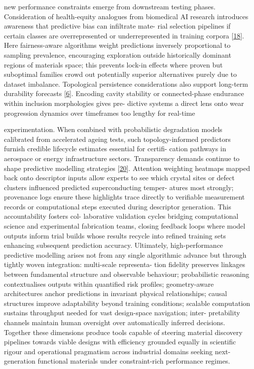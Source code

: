 \documentclass[
]{article}
\begin{document}
new performance constraints emerge from downstream testing phases.
Consideration of health-equity analogues from biomedical AI research
introduces awareness that predictive bias can infiltrate mate- rial
selection pipelines if certain classes are overrepresented or
underrepresented in training corpora
{[}\protect\hyperlink{_bookmark58}{18}{]}. Here fairness-aware
algorithms weight predictions inversely proportional to sampling
prevalence, encouraging exploration outside historically dominant
regions of materials space; this prevents lock-in effects where proven
but suboptimal families crowd out potentially superior alternatives
purely due to dataset imbalance. Topological persistence considerations
also support long-term durability forecasts
{[}\protect\hyperlink{_bookmark46}{6}{]}. Encoding cavity stability or
connected-phase endurance within inclusion morphologies gives pre-
dictive systems a direct lens onto wear progression dynamics over
timeframes too lengthy for real-time

experimentation. When combined with probabilistic degradation models
calibrated from accelerated ageing tests, such topology-informed
predictors furnish credible lifecycle estimates essential for certifi-
cation pathways in aerospace or energy infrastructure sectors.
Transparency demands continue to shape predictive modelling strategies
{[}\protect\hyperlink{_bookmark60}{20}{]}. Attention weighting heatmaps
mapped back onto descriptor inputs allow experts to see which crystal
sites or defect clusters influenced predicted superconducting temper-
atures most strongly; provenance logs ensure these highlights trace
directly to verifiable measurement records or computational steps
executed during descriptor generation. This accountability fosters col-
laborative validation cycles bridging computational science and
experimental fabrication teams, closing feedback loops where model
outputs inform trial builds whose results recycle into refined training
sets enhancing subsequent prediction accuracy. Ultimately,
high-performance predictive modelling arises not from any single
algorithmic advance but through tightly woven integration: multi-scale
representa- tion fidelity preserves linkages between fundamental
structure and observable behaviour; probabilistic reasoning
contextualises outputs within quantified risk profiles; geometry-aware
architectures anchor predictions in invariant physical relationships;
causal structures improve adaptability beyond training conditions;
scalable computation sustains throughput needed for vast design-space
navigation; inter- pretability channels maintain human oversight over
automatically inferred decisions. Together these dimensions produce
tools capable of steering material discovery pipelines towards viable
designs with efficiency grounded equally in scientific rigour and
operational pragmatism across industrial domains seeking next-generation
functional materials under constraint-rich performance regimes.
\end{document}
